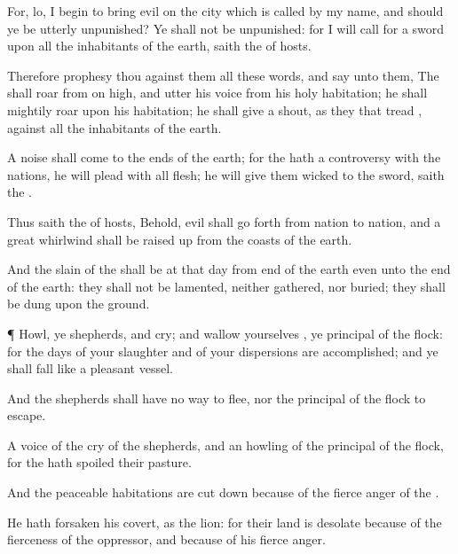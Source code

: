 {For, lo, I
begin to bring
evil on the
city which is
called by my
name, and should ye be
utterly
unpunished? Ye shall not be
unpunished: for I will
call for a
sword upon all the
inhabitants of the
earth,
saith the
{} of
hosts.


\par }{\PP {}Therefore
prophesy thou against them all these
words, and
say unto them, The
{} shall
roar from on
high, and
utter his
voice from his
holy
habitation; he shall
mightily
roar upon his
habitation; he shall
give a
shout, as they that
tread
{}, against all the
inhabitants of the
earth.

A
noise shall
come
{} to the
ends of the
earth; for the
{} hath a
controversy with the
nations, he will
plead with all
flesh; he will
give them
{}
wicked to the
sword,
saith the
{}.

Thus
saith the
{} of
hosts, Behold,
evil shall go
forth from
nation to
nation, and a
great
whirlwind shall be raised
up from the
coasts of the
earth.

And the
slain of the
{} shall be at that
day from
{}
end of the
earth even unto the
{}
end of the
earth: they shall not be
lamented, neither
gathered, nor
buried; they shall be
dung
upon the
ground.


\par }{\PP {}¶
Howl, ye
shepherds, and
cry; and
wallow yourselves
{}, ye
principal of the
flock: for the
days of your
slaughter and of your
dispersions are
accomplished; and ye shall
fall like a
pleasant
vessel.

And the
shepherds shall have no
way to
flee, nor the
principal of the
flock to
escape.

A
voice of the
cry of the
shepherds, and an
howling of the
principal of the
flock,
{} for the
{} hath
spoiled their
pasture.

And the
peaceable
habitations are cut
down
because of the
fierce
anger of the
{}.

He hath
forsaken his
covert, as the
lion: for their
land is
desolate
because of the
fierceness of the
oppressor, and
because of his
fierce
anger.




}
